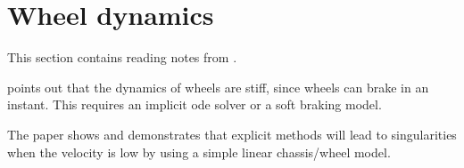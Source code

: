 \section{Wheel dynamics}

This section contains reading notes from \cite{rill}.


\cite{rill} points out that the dynamics of wheels are stiff, since wheels can brake in an instant. This requires an implicit ode solver or a soft braking model.

The paper shows and demonstrates that explicit methods will lead to singularities when the velocity is low by using a simple linear chassis/wheel model.


